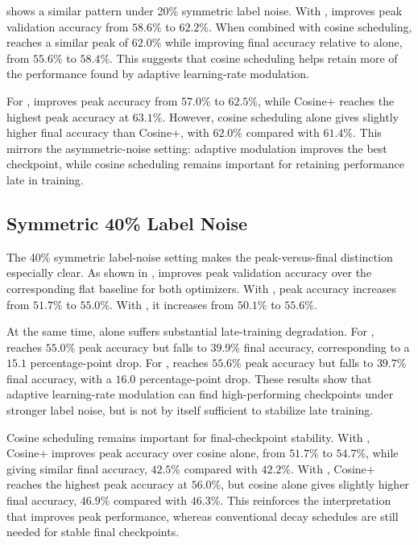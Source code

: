  shows a similar pattern under 20\% symmetric label noise. With \adamw{}, \method{} improves peak validation accuracy from $58.6\%$ to $62.2\%$. When combined with cosine scheduling, \method{} reaches a similar peak of $62.0\%$ while improving final accuracy relative to \method{} alone, from $55.6\%$ to $58.4\%$. This suggests that cosine scheduling helps retain more of the performance found by adaptive learning-rate modulation.

For \sgdm{}, \method{} improves peak accuracy from $57.0\%$ to $62.5\%$, while Cosine+\method{} reaches the highest peak accuracy at $63.1\%$. However, cosine scheduling alone gives slightly higher final accuracy than Cosine+\method{}, with $62.0\%$ compared with $61.4\%$. This mirrors the asymmetric-noise setting: adaptive modulation improves the best checkpoint, while cosine scheduling remains important for retaining performance late in training.

\FloatBarrier
\subsection{Symmetric 40\% Label Noise}



The 40\% symmetric label-noise setting makes the peak-versus-final distinction especially clear. As shown in , \method{} improves peak validation accuracy over the corresponding flat baseline for both optimizers. With \adamw{}, peak accuracy increases from $51.7\%$ to $55.0\%$. With \sgdm{}, it increases from $50.1\%$ to $55.6\%$.

At the same time, \method{} alone suffers substantial late-training degradation. For \adamw{}, \method{} reaches $55.0\%$ peak accuracy but falls to $39.9\%$ final accuracy, corresponding to a $15.1$ percentage-point drop. For \sgdm{}, \method{} reaches $55.6\%$ peak accuracy but falls to $39.7\%$ final accuracy, with a $16.0$ percentage-point drop. These results show that adaptive learning-rate modulation can find high-performing checkpoints under stronger label noise, but is not by itself sufficient to stabilize late training.

Cosine scheduling remains important for final-checkpoint stability. With \adamw{}, Cosine+\method{} improves peak accuracy over cosine alone, from $51.7\%$ to $54.7\%$, while giving similar final accuracy, $42.5\%$ compared with $42.2\%$. With \sgdm{}, Cosine+\method{} reaches the highest peak accuracy at $56.0\%$, but cosine alone gives slightly higher final accuracy, $46.9\%$ compared with $46.3\%$. This reinforces the interpretation that \method{} improves peak performance, whereas conventional decay schedules are still needed for stable final checkpoints.

